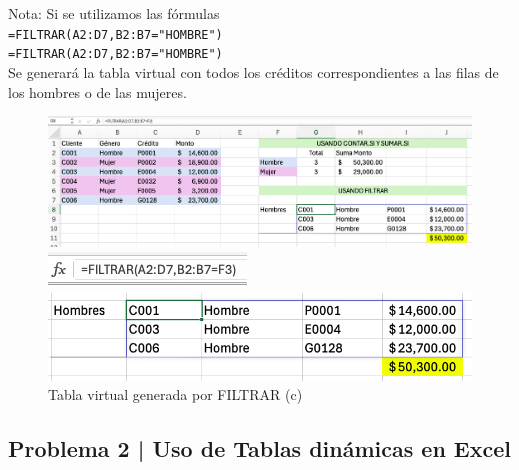 \documentclass{article}
\begin{document}
\noindent
Nota: Si se utilizamos las fórmulas
\\[12pt]
\texttt{=FILTRAR(A2:D7,B2:B7="HOMBRE")}
\\[0pt]
\texttt{=FILTRAR(A2:D7,B2:B7="HOMBRE")}
\\[12pt]
Se generará la tabla virtual con todos los créditos correspondientes a las filas de los hombres o de las mujeres.
\begin{figure}[!ht]
    \centering
    \begin{minipage}{\textwidth}
        \centering
        \includegraphics[width=\textwidth]{figures/s101-2.png}
    \end{minipage}
    \hfill
    \begin{minipage}{\textwidth}
        \centering
        \includegraphics[width=\textwidth]{figures/s101-3.png}
    \end{minipage}
    \hfill
    \begin{minipage}{\textwidth}
        \centering
        \includegraphics[width=\textwidth]{figures/s101-4.png}
    \end{minipage}
    \captionsetup{width=0.9\textwidth}
    \caption{Tabla virtual generada por FILTRAR (c)}
    \label{fig:s101-c}
\end{figure}

\clearpage

\subsection*{Problema 2 | Uso de Tablas dinámicas en Excel}
\end{document}
